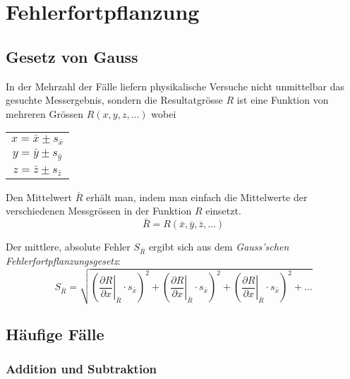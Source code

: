 \section{Fehlerfortpflanzung}

\subsection{Gesetz von Gauss}

In der Mehrzahl der F\"alle liefern physikalische Versuche nicht unmittelbar das gesuchte Messergebnis,
sondern die Resultatgr\"osse $R$ ist eine Funktion von mehreren Gr\"ossen $R(x, y, z, \ldots)$
wobei
\begin{center}
    \begin{tabular}{c}
        $x = \bar{x} \pm s_{\bar{x}}$ \\
        $y = \bar{y} \pm s_{\bar{y}}$ \\
        $z = \bar{z} \pm s_{\bar{z}}$ \\
    \end{tabular}
\end{center}

Den Mittelwert $\bar{R}$ erh\"alt man, indem man einfach die Mittelwerte der verschiedenen Messgr\"ossen
in der Funktion $R$ einsetzt.
\begin{equation}
    \bar{R} = R(\bar{x}, \bar{y}, \bar{z}, \ldots)
\end{equation}

Der mittlere, absolute Fehler $S_{\bar{R}}$ ergibt sich aus dem \emph{Gauss'schen Fehlerfortpflanzungsgesetz}:
\begin{equation}
    S_{\bar{R}} = \sqrt{  \left( \left.\frac{\partial R}{\partial x} \right\rvert_{\bar{R}} \cdot s_{\bar{x}} \right)^2
                        + \left( \left.\frac{\partial R}{\partial x} \right\rvert_{\bar{R}} \cdot s_{\bar{x}} \right)^2
                        + \left( \left.\frac{\partial R}{\partial x} \right\rvert_{\bar{R}} \cdot s_{\bar{x}} \right)^2
                        + \ldots }
\end{equation}


\subsection{H\"aufige F\"alle}

\subsubsection{Addition und Subtraktion}

